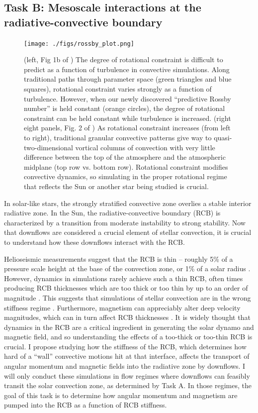 \documentclass[11pt, preprint]{aastex}
\begin{document}
\subsection*{Task B: Mesoscale interactions at the radiative-convective boundary}
\vspace{-0.3cm}
\label{sct:taskB}
\begin{figure}[t!]
    \texttt{[image: ./figs/rossby\_plot.png]}
    \caption{(left, Fig 1b of \citet{anders&all2019}) The degree of rotational constraint is difficult to predict as a function of turbulence in convective simulations.
	Along traditional paths through parameter space (green triangles and blue squares), rotational constraint varies strongly as a function of turbulence.
	However, when our newly discovered ``predictive Rossby number'' is held constant (orange circles), the degree of rotational constraint can be held constant while turbulence is increased.
	(right eight panels, Fig. 2 of \citet{anders&all2019}) As rotational constraint increases (from left to right), traditional granular convective patterns give way to quasi-two-dimensional vortical columns of convection with very little difference between the top of the atmosphere and the atmospheric midplane (top row vs. bottom row).
	Rotational constraint modifies convective dynamics, so simulating in the proper rotational regime that reflects the Sun or another star being studied is crucial.
	\label{fig:rossby_plot} }
\end{figure}

In solar-like stars, the strongly stratified convective zone overlies a stable interior radiative zone.
In the Sun, the radiative-convective boundary (RCB) is characterized by a transition from moderate instability to strong stability.
Now that downflows are considered a crucial element of stellar convection, it is crucial to understand how these downflows interact with the RCB.

Helioseismic measurements suggest that the RCB is thin -- roughly 5\% of a pressure scale height at the base of the convection zone, or 1\% of a solar radius \citep{basu1997}.
However, dynamics in simulations rarely achieve such a thin RCB, often times producing RCB thicknesses which are too thick or too thin by up to an order of magnitude \citep[see e.g.,][]{hotta2017, kapyla2018}.
This suggests that simulations of stellar convection are in the wrong stiffness regime \citep{brummell&all2002, couston&all2017}.
Furthermore, magnetism can appreciably alter deep velocity magnitudes, which can in turn affect RCB thicknesses \citep{hotta&all2015}.
It is widely thought that dynamics in the RCB are a critical ingredient in generating the solar dynamo and magnetic field, and so understanding the effects of a too-thick or too-thin RCB is crucial.
I propose studying how the stiffness of the RCB, which determines how hard of a ``wall'' convective motions hit at that interface, affects the transport of angular momentum and magnetic fields into the radiative zone by downflows.
I will only conduct these simulations in flow regimes where downflows can feasibly transit the solar convection zone, as determined by Task A.
In those regimes, the goal of this task is to determine how angular momentum and magnetism are pumped into the RCB as a function of RCB stiffness.
\end{document}
